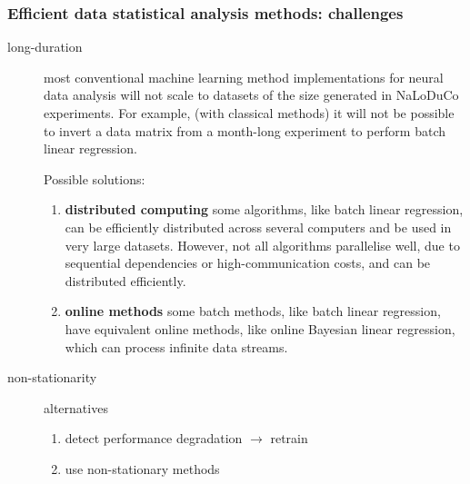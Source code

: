 \documentclass{beamer}
\begin{document}
\begin{frame}
    \frametitle{Efficient data statistical analysis methods: challenges}

    \small
    \begin{description}

        \item[long-duration] most conventional machine learning method
            implementations for neural data analysis will not scale to datasets
            of the size generated in NaLoDuCo experiments. For example, (with
            classical methods) it will not be possible to invert a data matrix
            from a month-long experiment to perform batch linear regression.

            Possible solutions:

            \begin{enumerate}

                \item \textbf{distributed computing} some algorithms, like
                    batch linear regression, can be efficiently distributed
                    across several computers and be used in very large
                    datasets.
                    However, not all algorithms parallelise well, due to
                    sequential dependencies or high-communication costs, and
                    can be distributed efficiently.


                \item \textbf{online methods} some batch methods, like batch
                    linear regression,  have equivalent online methods, like
                    online Bayesian linear regression, which can process
                    infinite data streams.

            \end{enumerate}

        \item[non-stationarity] alternatives

            \begin{enumerate}
                \item detect performance degradation $\rightarrow$ retrain

                \item use non-stationary methods
            \end{enumerate}

    \end{description}
    \normalsize

\end{frame}
\end{document}
